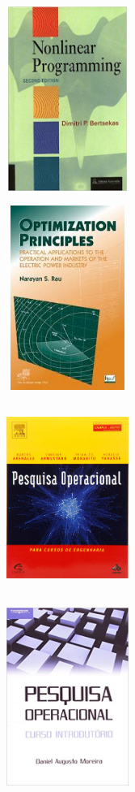 \documentclass{beamer}
\begin{document}
\begin{frame}
{
	\begin{figure}[!htb]
		\includegraphics[width=4cm, height=6cm]{nonlinearprogramming.jpg}
	\end{figure}
}

{
	\begin{figure}[!htb]
		\includegraphics[width=4cm, height=6cm]{optimizationprinciples.jpg}
	\end{figure}
}

{
	\begin{figure}[!htb]
		\includegraphics[width=4cm, height=6cm]{Pesquisa-Operacional-Para-Cursos-de-Engenharia-118182.jpg}
	\end{figure}
}

{
	\begin{figure}[!htb]
		\includegraphics[width=4cm, height=6cm]{pesquisaoperacionalmoreira.jpg}
	\end{figure}
}


\end{frame}
\end{document}

